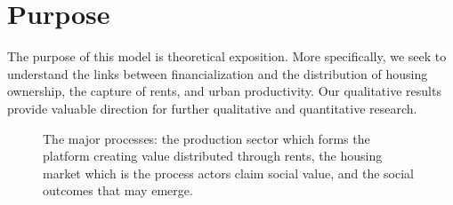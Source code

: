 \section{Purpose}
The purpose of this model is \gls{theoretical exposition}. More specifically, we seek to understand the links between financialization and  the distribution of housing ownership, the capture of rents, and  urban productivity. %
Our qualitative results provide valuable direction for further qualitative and quantitative research.
\begin{figure}[h!tb]
\centering
{}
\caption[The platform, the process, and the outcomes]{The major processes: the production sector which forms the platform creating value distributed through rents, the housing market which is the process actors claim social value, and the social outcomes that may emerge. %
}
\label{fig:outcomes}
\end{figure}


